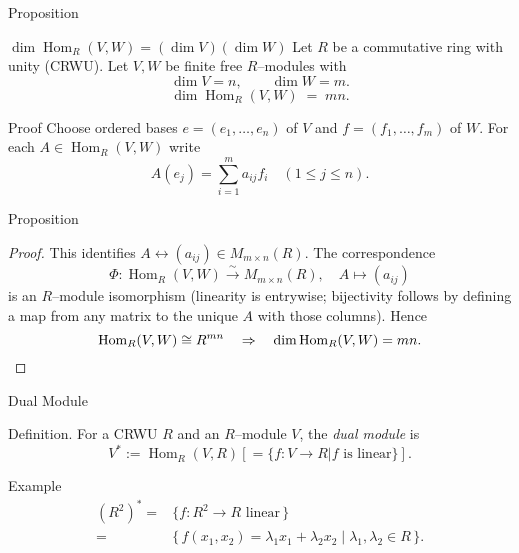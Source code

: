
\date{22 October 2025}



\begin{frame}
  \cmctitleframe
\end{frame}

\begin{frame}{Proposition}
\vspace{-0.3cm}
\begin{block}{$\dim \operatorname{Hom}_R(V,W) = (\dim V)(\dim W)$}
Let $R$ be a commutative ring with unity (CRWU). Let $V,W$ be finite free $R$–modules with
\[
\dim V = n,\qquad \dim W = m.
\]
\[
\dim \operatorname{Hom}_R(V,W) \;=\; mn.
\]
\end{block}
\vspace{-0.3cm}
\begin{block}{Proof}
Choose ordered bases $e=(e_1,\dots,e_n)$ of $V$ and $f=(f_1,\dots,f_m)$ of $W$. For each $A\in \operatorname{Hom}_R(V,W)$ write
\[
A(e_j)=\sum_{i=1}^m a_{ij} f_i \quad (1\le j\le n).
\]
\end{block}

\end{frame}

\begin{frame}{Proposition}

\begin{proof}

This identifies $A \longleftrightarrow (a_{ij}) \in M_{m\times n}(R)$. The correspondence
\[
\Phi:\operatorname{Hom}_R(V,W) \xrightarrow{\;\sim\;} M_{m\times n}(R),\quad A\mapsto (a_{ij})
\]
is an $R$–module isomorphism (linearity is entrywise; bijectivity follows by defining a map from any matrix to the unique $A$ with those columns). Hence
\[
\operatorname{Hom}_R(V,W)\cong R^{mn}\quad\Rightarrow\quad \dim \operatorname{Hom}_R(V,W)=mn.\qedhere
\]
\end{proof}
\end{frame}

\begin{frame}{Dual Module}
\begin{block}{Definition.} For a CRWU $R$ and an $R$–module $V$, the \emph{dual module} is
\[
V^* := \operatorname{Hom}_R(V,R) \left[= \{f: V\to R|f\text{ is linear}\}\right].
\]
\end{block}
\begin{block}{Example}
\begin{align*}
(R^2)^*=&\{f:R^2\to R\text{ linear}\,\}\\
=&\{\,f(x_1,x_2)=\lambda_1 x_1+\lambda_2 x_2\mid \lambda_1,\lambda_2\in R\,\}.
\end{align*}

\end{block}
\end{frame}


